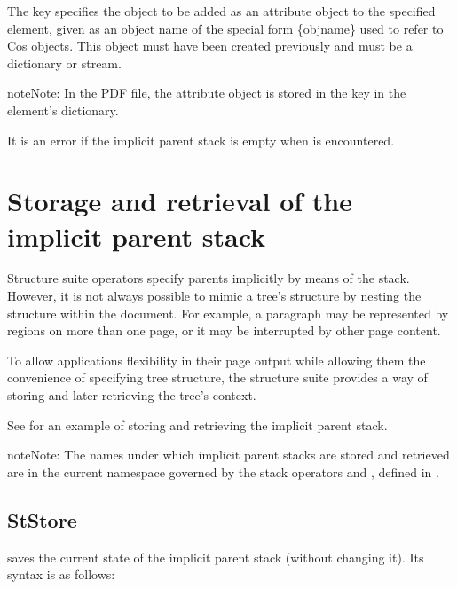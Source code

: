 \documentclass[letterpaper,12pt,english,openany,oneside]{sphinxmanual}
\begin{document}
The  key specifies the object to be added as an attribute object to the specified element, given as an object name of the special form \{objname\} used to refer to Cos objects. This object must have been created previously and must be a dictionary or stream.

\begin{sphinxadmonition}{note}{Note:}
In the PDF file, the attribute object is stored in the  key in the element’s dictionary.
\end{sphinxadmonition}

It is an error if the implicit parent stack is empty when  is encountered.


\section{Storage and retrieval of the implicit parent stack}
\label{\detokenize{pdfmark_Logical:storage-and-retrieval-of-the-implicit-parent-stack}}
Structure suite operators specify parents implicitly by means of the stack. However, it is not always possible to mimic a tree’s structure by nesting the structure within the document. For example, a paragraph may be represented by regions on more than one page, or it may be interrupted by other page content.

To allow applications flexibility in their page output while allowing them the convenience of specifying tree structure, the structure suite provides a way of storing and later retrieving the tree’s context.

See  for an example of storing and retrieving the implicit parent stack.

\begin{sphinxadmonition}{note}{Note:}
The names under which implicit parent stacks are stored and retrieved are in the current namespace governed by the stack operators  and  , defined in .
\end{sphinxadmonition}


\subsection{StStore}
\label{\detokenize{pdfmark_Logical:ststore}}
 saves the current state of the implicit parent stack (without changing it). Its syntax is as follows:
\end{document}
